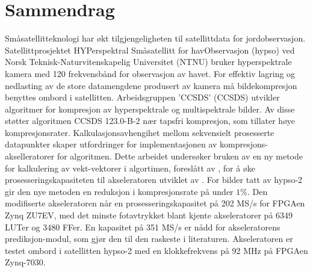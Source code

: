 \chapter*{Sammendrag}

Småsatellitteknologi har økt tilgjengeligheten til satellittdata for jordobservasjon. Satellittprosjektet HYPerspektral Småsatellitt for havObservasjon (\acrshort{hypso}) ved Norsk Teknisk-Naturvitenskapelig Universitet (NTNU) bruker hyperspektrale kamera med 120 frekvensbånd for observasjon av havet. For effektiv lagring og nedlasting av de store datamengdene produsert av kamera må bildekompresjon benyttes ombord i satellitten. Arbeidsgruppen '\acrlong{CCSDS}' (\acrshort{CCSDS}) utvikler algoritmer for kompresjon av hyperspektrale og multispektrale bilder. Av disse støtter algoritmen CCSDS 123.0-B-2 nær tapsfri kompresjon, som tillater høye kompresjonsrater. Kalkulasjonsavhengihet mellom sekvensielt prosesserte datapunkter skaper utfordringer for implementasjonen av kompresjons-akselleratorer for algoritmen. Dette arbeidet undersøker bruken av en ny metode for kalkulering av vekt-vektorer i algortimen, foreslått av \citeauthor{jiaRemovalFeedbackLoop2025}, for å øke prosesseringskapasiteten til akseleratoren utviklet av \citeauthor{vorhaugHyperspectralImageCompression2024}. For bilder tatt av \acrshort{hypso}-2 gir den nye metoden en reduksjon i kompresjonsrate på under $1\%$. Den modifiserte akseleratoren når en prosesseringskapasitet på 202 MS/s for \acrshort{FPGA}en Zynq ZU7EV, med det minste fotavtrykket blant kjente akseleratorer på 6349 LUTer og 3480 FFer. En kapasitet på 351 MS/s er nådd for akseleratorens prediksjon-modul, som gjør den til den raskeste i literaturen. Akseleratoren er testet ombord i satellitten \acrshort{hypso}-2 med en klokkefrekvens på 92 MHz på \acrshort{FPGA}en Zynq-7030.
